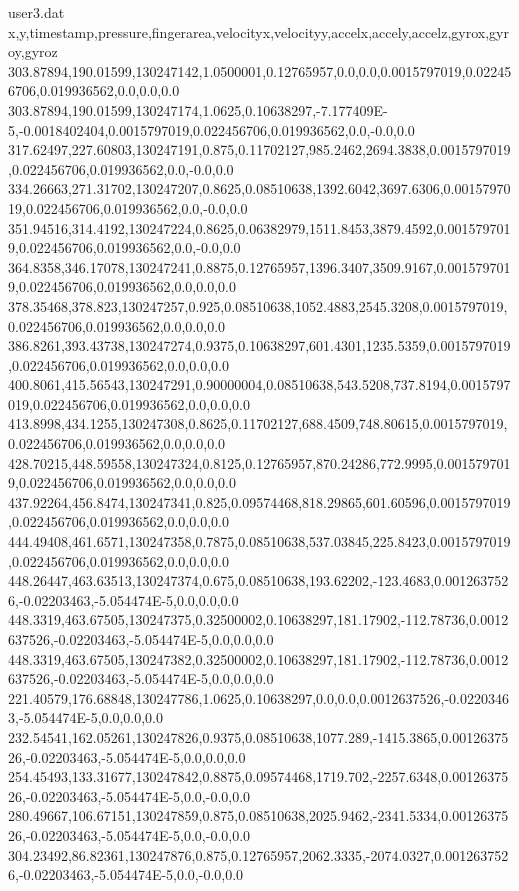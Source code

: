 \begin{filecontents}{user3.dat}
x,y,timestamp,pressure,fingerarea,velocityx,velocityy,accelx,accely,accelz,gyrox,gyroy,gyroz
303.87894,190.01599,130247142,1.0500001,0.12765957,0.0,0.0,0.0015797019,0.022456706,0.019936562,0.0,0.0,0.0
303.87894,190.01599,130247174,1.0625,0.10638297,-7.177409E-5,-0.0018402404,0.0015797019,0.022456706,0.019936562,0.0,-0.0,0.0
317.62497,227.60803,130247191,0.875,0.11702127,985.2462,2694.3838,0.0015797019,0.022456706,0.019936562,0.0,-0.0,0.0
334.26663,271.31702,130247207,0.8625,0.08510638,1392.6042,3697.6306,0.0015797019,0.022456706,0.019936562,0.0,-0.0,0.0
351.94516,314.4192,130247224,0.8625,0.06382979,1511.8453,3879.4592,0.0015797019,0.022456706,0.019936562,0.0,-0.0,0.0
364.8358,346.17078,130247241,0.8875,0.12765957,1396.3407,3509.9167,0.0015797019,0.022456706,0.019936562,0.0,0.0,0.0
378.35468,378.823,130247257,0.925,0.08510638,1052.4883,2545.3208,0.0015797019,0.022456706,0.019936562,0.0,0.0,0.0
386.8261,393.43738,130247274,0.9375,0.10638297,601.4301,1235.5359,0.0015797019,0.022456706,0.019936562,0.0,0.0,0.0
400.8061,415.56543,130247291,0.90000004,0.08510638,543.5208,737.8194,0.0015797019,0.022456706,0.019936562,0.0,0.0,0.0
413.8998,434.1255,130247308,0.8625,0.11702127,688.4509,748.80615,0.0015797019,0.022456706,0.019936562,0.0,0.0,0.0
428.70215,448.59558,130247324,0.8125,0.12765957,870.24286,772.9995,0.0015797019,0.022456706,0.019936562,0.0,0.0,0.0
437.92264,456.8474,130247341,0.825,0.09574468,818.29865,601.60596,0.0015797019,0.022456706,0.019936562,0.0,0.0,0.0
444.49408,461.6571,130247358,0.7875,0.08510638,537.03845,225.8423,0.0015797019,0.022456706,0.019936562,0.0,0.0,0.0
448.26447,463.63513,130247374,0.675,0.08510638,193.62202,-123.4683,0.0012637526,-0.02203463,-5.054474E-5,0.0,0.0,0.0
448.3319,463.67505,130247375,0.32500002,0.10638297,181.17902,-112.78736,0.0012637526,-0.02203463,-5.054474E-5,0.0,0.0,0.0
448.3319,463.67505,130247382,0.32500002,0.10638297,181.17902,-112.78736,0.0012637526,-0.02203463,-5.054474E-5,0.0,0.0,0.0
221.40579,176.68848,130247786,1.0625,0.10638297,0.0,0.0,0.0012637526,-0.02203463,-5.054474E-5,0.0,0.0,0.0
232.54541,162.05261,130247826,0.9375,0.08510638,1077.289,-1415.3865,0.0012637526,-0.02203463,-5.054474E-5,0.0,0.0,0.0
254.45493,133.31677,130247842,0.8875,0.09574468,1719.702,-2257.6348,0.0012637526,-0.02203463,-5.054474E-5,0.0,-0.0,0.0
280.49667,106.67151,130247859,0.875,0.08510638,2025.9462,-2341.5334,0.0012637526,-0.02203463,-5.054474E-5,0.0,-0.0,0.0
304.23492,86.82361,130247876,0.875,0.12765957,2062.3335,-2074.0327,0.0012637526,-0.02203463,-5.054474E-5,0.0,-0.0,0.0

\end{filecontents}
